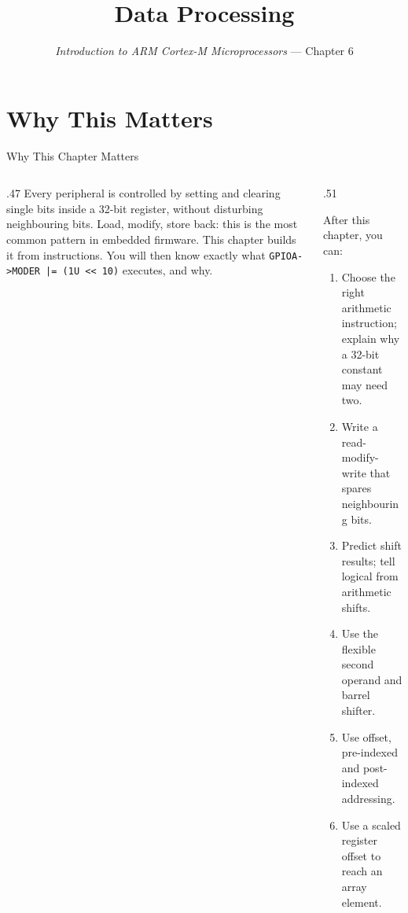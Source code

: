 \documentclass[9pt,aspectratio=169,xcolor=table]{beamer}
\title{Data Processing}
\subtitle{\emph{Introduction to ARM Cortex-M Microprocessors} --- Chapter 6}
\begin{document}
\titlepage

\section{Why This Matters}

\begin{frame}[fragile]{Why This Chapter Matters}
    \begin{columns}[T]
    \begin{column}{.47\textwidth}
        {\normalsize Every peripheral is controlled by setting and clearing single bits inside a 32-bit register, without disturbing neighbouring bits. Load, modify, store back: this is the most common pattern in embedded firmware. This chapter builds it from instructions. You will then know exactly what \verb+GPIOA->MODER |= (1U << 10)+ executes, and why.}
    \end{column}
    \begin{column}{.51\textwidth}
        \begin{block}{After this chapter, you can:}
        {\small
        \begin{enumerate}\itemsep2pt
            \item Choose the right arithmetic instruction; explain why a 32-bit constant may need two.
            \item Write a read-modify-write that spares neighbouring bits.
            \item Predict shift results; tell logical from arithmetic shifts.
            \item Use the flexible second operand and barrel shifter.
            \item Use offset, pre-indexed and post-indexed addressing.
            \item Use a scaled register offset to reach an array element.
        \end{enumerate}}
        \end{block}
    \end{column}
    \end{columns}
\end{frame}
\end{document}
